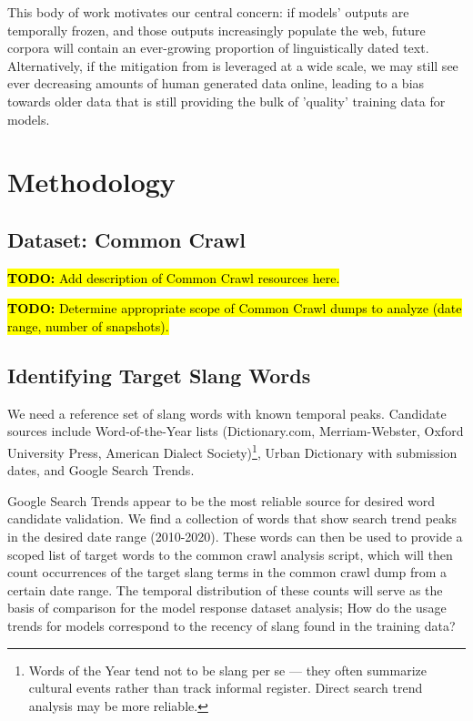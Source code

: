 \documentclass[11pt]{article}
\newcommand{\todo}[1]{\hl{\textbf{TODO:} #1}}
\begin{document}
This body of work motivates our central concern: if models' outputs are temporally frozen, and those outputs increasingly populate the web, future corpora will contain an ever-growing proportion of linguistically
dated text. Alternatively, if the mitigation from \citet{feng2024collapse} is leveraged at a wide scale, we may still see ever decreasing amounts of human generated data online, leading to a bias towards older data that is still providing the bulk of 'quality' training data for models.

\section{Methodology}

\subsection{Dataset: Common Crawl}

\todo{Add description of Common Crawl resources here.}

\todo{Determine appropriate scope of Common Crawl dumps to analyze (date
range, number of snapshots).}

\subsection{Identifying Target Slang Words}

We need a reference set of slang words with known temporal peaks.
Candidate sources include Word-of-the-Year lists (Dictionary.com,
Merriam-Webster, Oxford University Press, American Dialect Society)\footnote{Words of the Year tend not to be slang per
se --- they often summarize cultural events rather than track informal
register. Direct search trend analysis may be more reliable.},
Urban Dictionary with submission dates, and Google Search Trends.

Google Search Trends appear to be the most reliable source for desired word candidate validation. We find a collection of words that show search trend peaks in the desired date range (2010-2020). These words can then be used to provide a scoped list of target words to the common crawl analysis script, which will then count occurrences of the target slang terms in the common crawl dump from a certain date range. The temporal distribution of these counts will serve as the basis of comparison for the model response dataset analysis; How do the usage trends for models correspond to the recency of slang found in the training data?
\end{document}
